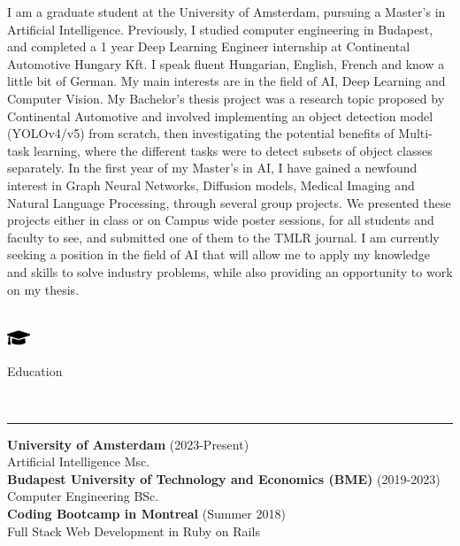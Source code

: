 \documentclass{article}
\begin{document}
\small I am a graduate student at the University of Amsterdam, pursuing a Master's in Artificial Intelligence. Previously, I studied computer engineering in Budapest, and completed a 1 year Deep Learning Engineer internship at Continental Automotive Hungary Kft. I speak fluent Hungarian, English, French and know a little bit of German. My main interests are in the field of AI, Deep Learning and Computer Vision. My Bachelor's thesis project was a research topic proposed by Continental Automotive and involved implementing an object detection model (YOLOv4/v5) from scratch, then investigating the potential benefits of Multi-task learning, where the different tasks were to detect subsets of object classes separately. In the first year of my Master's in AI, I have gained a newfound interest in Graph Neural Networks, Diffusion models, Medical Imaging and Natural Language Processing, through several group projects. We presented these projects either in class or on Campus wide poster sessions, for all students and faculty to see, and submitted one of them to the TMLR journal. I am currently seeking a position in the field of AI that will allow me to apply my knowledge and skills to solve industry problems, while also providing an opportunity to work on my thesis. \\
\\
\begin{minipage}[c]{7mm}
    \includegraphics[width=7mm]{../images/graduation-cap-solid.pdf}
\end{minipage}
\begin{minipage}[c]{100mm}
    {\large{Education}}
\end{minipage} \\
\hrule
\bigskip

\noindent
\textbf{University of Amsterdam} \hspace{3mm} \color{gray} (2023-Present) \color{black} \\
Artificial Intelligence Msc.
\smallskip \\

\noindent
\textbf{Budapest University of Technology and Economics (BME)} \hspace{3mm} \color{gray} (2019-2023) \color{black} \\
Computer Engineering BSc.
\smallskip \\

\noindent
\textbf{Coding Bootcamp in Montreal} \hspace{3mm} \color{gray} (Summer 2018) \color{black} \\
Full Stack Web Development in Ruby on Rails
\smallskip \\
\end{document}
